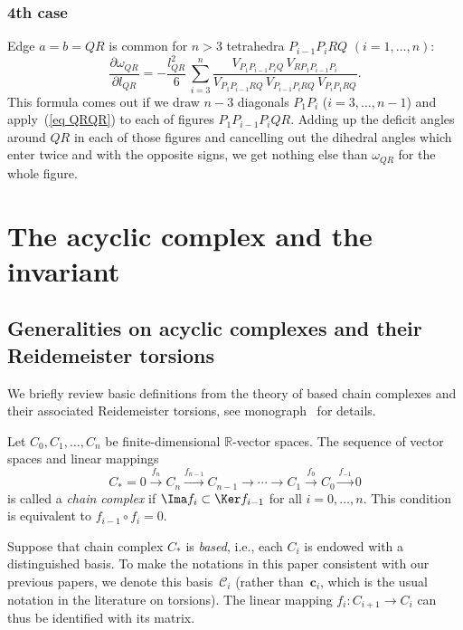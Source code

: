 \subsubsection*{4th case}
Edge $a=b=QR$ is common for $n > 3$ tetrahedra $P_{i-1}P_iRQ$ $(i = 1,\ldots,n)$:
\begin{equation}
\frac{\partial \omega_{QR}}{\partial l_{QR}} = -\frac {l_{QR}^2}{6}\, \sum\limits_{i=3}^n
\frac {V_{P_1P_{i-1}P_iQ}\,V_{RP_1P_{i-1}P_i}}{V_{P_1P_{i-1}RQ}\,V_{P_{i-1}P_iRQ}\,V_{P_iP_1RQ}}.
\label{eq QRQRn}
\end{equation}
This formula comes out if we draw $n-3$ diagonals $P_1P_i$ ($i = 3,\ldots,n-1$) and apply~(\ref{eq QRQR}) to each of f\/igures $P_1P_{i-1}P_iQR$. Adding up the def\/icit angles around $QR$ in each of those f\/igures and cancelling out the dihedral angles which enter twice and with the opposite signs, we get nothing else than $\omega_{QR}$ for the whole f\/igure.


\section{The acyclic complex and the invariant}
\label{sec_acyclic_general}

\subsection{Generalities on acyclic complexes and their Reidemeister torsions}

We brief\/ly review basic def\/initions from the theory of based chain complexes and their associated Reidemeister torsions, see monograph~\cite{Turaev:2001} for details.

\begin{definition}
\label{dfn:cmplx}
Let $C_0, C_1, \ldots , C_n$ be f\/inite-dimensional $\mathbb R$-vector spaces. The sequence of vector spaces and linear mappings
\begin{equation}
\label{eq:cmplx}
C_* = 0 \xrightarrow{f_n} C_n \xrightarrow{f_{n-1}} C_{n-1} \xrightarrow{} \cdots \xrightarrow{} C_1 \xrightarrow{f_0} C_0 \xrightarrow{f_{-1}} 0
\end{equation}
is called a \emph{chain complex} if $\Ima f_i \subset \Ker f_{i-1}$ for all $i = 0, \ldots, n$. This condition is equivalent to $f_{i-1} \circ f_i = 0$.
\end{definition}

Suppose that chain complex $C_*$ is \emph{based}, i.e., each $C_i$ is endowed with a distinguished basis. To make the notations in this paper consistent with our previous papers, we denote this basis~$\mathcal C_i$ (rather than~$\mathbf c_i$, which is the usual notation in the literature on torsions). The linear mapping $f_i \colon C_{i + 1} \to C_i$ can thus be identif\/ied with its matrix.


